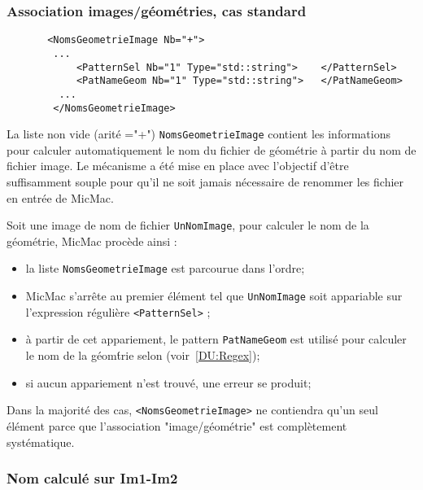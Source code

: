 \subsubsection{Association images/g\'eom\'etries, cas standard}

\label{Assoc:Image:Geom}

\begin{verbatim}
       <NomsGeometrieImage Nb="+">
        ...
            <PatternSel Nb="1" Type="std::string">    </PatternSel>
            <PatNameGeom Nb="1" Type="std::string">   </PatNameGeom>
         ...
        </NomsGeometrieImage>
\end{verbatim}

La liste non vide (arit\'e ="+") {\tt NomsGeometrieImage} contient
les informations pour calculer automatiquement le nom du fichier
de  g\'eom\'etrie \`a partir du nom de fichier image. Le m\'ecanisme
a \'et\'e mise en place avec l'objectif d'\^etre suffisamment souple
pour qu'il ne soit jamais n\'ecessaire
de renommer les fichier en entr\'ee  de MicMac.

Soit une image de nom de fichier {\tt UnNomImage}, pour calculer
le nom de la g\'eom\'etrie, MicMac proc\`ede ainsi :

\begin{itemize}
   \item la liste {\tt NomsGeometrieImage} est parcourue dans l'ordre;
   \item MicMac s'arr\^ete au premier \'el\'ement tel que {\tt UnNomImage}
         soit appariable sur l'expression r\'eguli\`ere {\tt <PatternSel>} ;
   \item  \`a partir de cet appariement, le pattern {\tt PatNameGeom} 
          est utilis\'e pour calculer le nom de la g\'eom\'trie selon
           (voir~\ref{DU:Regex});
   \item  si aucun appariement n'est trouv\'e, une erreur se produit;
\end{itemize}

Dans la majorit\'e des cas, {\tt <NomsGeometrieImage>} ne contiendra
qu'un seul \'el\'ement parce que l'association "image/g\'eom\'etrie"
est compl\`etement syst\'ematique.



\subsubsection{Nom calcul\'e sur Im1-Im2}
\PourLecteurAverti


